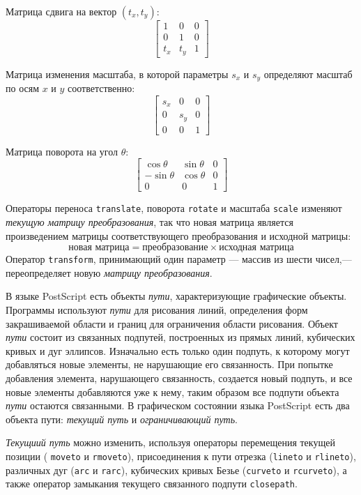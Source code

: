 \documentclass[14pt]{extarticle}
\begin{document}
Матрица сдвига на вектор $(t_x, t_y)$:
\[
\begin{bmatrix}
1 & 0 & 0 \\ 0 & 1 & 0 \\ t_x & t_y & 1
\end{bmatrix}
\]

Матрица изменения масштаба, в которой параметры $s_x$ и $s_y$ определяют масштаб по осям $x$ и $y$ соответственно:
\[
\begin{bmatrix}
s_x & 0 & 0 \\ 0 & s_y & 0 \\ 0 & 0 & 1
\end{bmatrix}
\]

Матрица поворота на угол $\theta$:
\[
\begin{bmatrix}
\cos \theta & \sin \theta & 0 \\ -\sin \theta & \cos \theta & 0 \\ 0 & 0 & 1
\end{bmatrix}
\]

 Операторы переноса \texttt{translate}, поворота \texttt{rotate} и масштаба \texttt{scale} изменяют \textit{текущую матрицу преобразования}, так что новая матрица является произведением матрицы соответствующего преобразования и исходной матрицы: 
\[ \texttt{новая матрица} = \texttt{преобразование} \times \texttt{исходная матрица} \]
Оператор \texttt{transform}, принимающий один параметр --- массив из шести чисел,--- переопределяет новую \textit{матрицу преобразования}. 

В языке PostScript есть объекты \textit{пути}, характеризующие графические объекты. Программы используют \textit{пути} для рисования линий, определения форм закрашиваемой области и границ для ограничения области рисования. 
Объект \textit{пути} состоит из связанных подпутей, построенных из прямых линий, кубических кривых и дуг эллипсов. Изначально есть только один подпуть, к которому могут добавляться новые элементы, не нарушающие его связанность. При попытке добавления элемента, нарушающего связанность, создается новый подпуть, и все новые элементы добавляются уже к нему, таким образом все подпути объекта \textit{пути} остаются связанными. В графическом состоянии языка PostScript есть два объекта пути: \textit{текущий путь} и \textit{ограничивающий путь}. 

\textit{Текущиий путь} можно изменить, используя операторы перемещения текущей позиции ( \texttt{moveto} и \texttt{rmoveto}), присоединения к пути отрезка (\texttt{lineto} и \texttt{rlineto}), различных дуг (\texttt{arc} и \texttt{rarc}), кубических кривых Безье (\texttt{curveto} и \texttt{rcurveto}), а также оператор замыкания текущего связанного подпути \texttt{closepath}.
\end{document}
